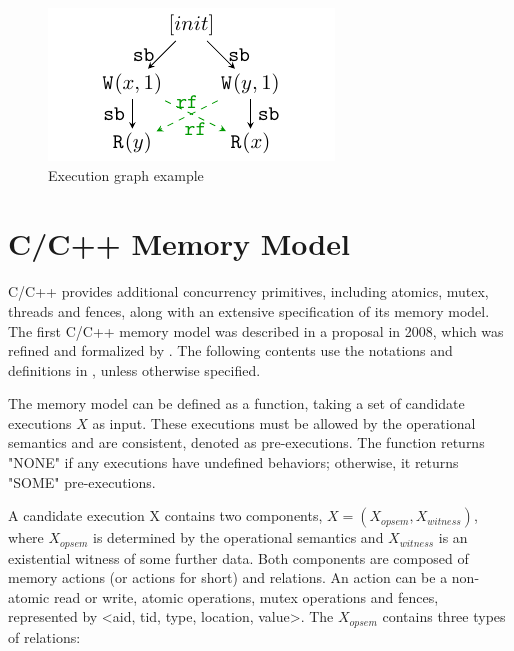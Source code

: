 \begin{figure}[h!tbp]
	\centering
	\includegraphics[scale=1.3]{figure/exec-graph/example.pdf} 
	\caption{Execution graph example} 
	\label{graph-example} 
\end{figure}





\section{C/C++ Memory Model}
C/C++ provides additional concurrency primitives, including atomics, mutex, threads and fences, along with an extensive specification of its memory model.
The first C/C++ memory model was described in a proposal\cite{c++model-proposal} in 2008, which was refined and formalized by \cite{c++model}. The following contents use the notations and definitions in \cite{c++model}, unless otherwise specified.

The memory model can be defined as a function, taking a set of candidate executions $X$ as input. These executions must be allowed by the operational semantics and are consistent, denoted as pre-executions. The function returns "NONE" if any executions have undefined behaviors; otherwise, it returns "SOME" pre-executions.

A candidate execution X contains two components, $X = (X_{opsem}, X_{witness})$, where $X_{opsem}$ is determined by the operational semantics and $X_{witness}$ is an existential witness of some further data. Both components are composed of memory actions (or actions for short) and relations. An action can be a non-atomic read or write, atomic operations, mutex operations and fences, represented by <aid, tid, type, location, value>. The $X_{opsem}$ contains three types of relations:

